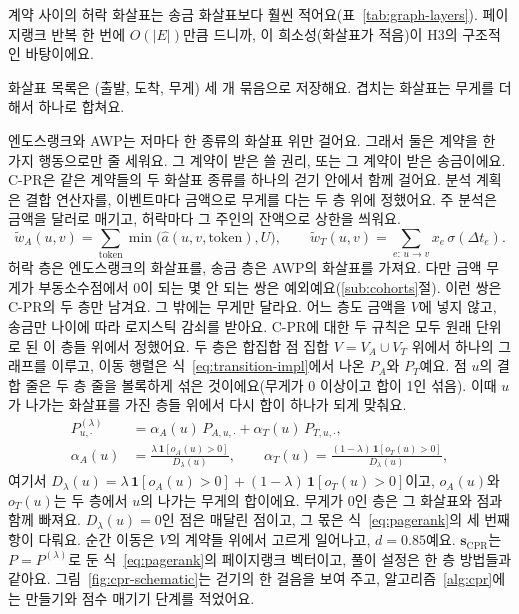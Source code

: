 계약 사이의 허락 화살표는 송금 화살표보다 훨씬 적어요(표~\ref{tab:graph-layers}). 페이지랭크 반복 한 번에 $O(|E|)$만큼 드니까, 이 희소성(화살표가 적음)이 H3의 구조적인 바탕이에요.

화살표 목록은 (출발, 도착, 무게) 세 개 묶음으로 저장해요. 겹치는 화살표는 무게를 더해서 하나로 합쳐요.


엔도스랭크와 AWP는 저마다 한 종류의 화살표 위만 걸어요. 그래서 둘은 계약을 한 가지 행동으로만 줄 세워요. 그 계약이 받은 쓸 권리, 또는 그 계약이 받은 송금이에요. \mbox{C-PR}은 같은 계약들의 두 화살표 종류를 하나의 걷기 안에서 함께 걸어요. 분석 계획은 결합 연산자를, 이벤트마다 금액으로 무게를 다는 두 층 위에 정했어요. 주 분석은 금액을 달러로 매기고, 허락마다 그 주인의 잔액으로 상한을 씌워요.
\begin{equation}
\label{eq:raw-layers}
\tilde w_A(u,v)
=
\sum_{\mathrm{token}}
\min\bigl(\hat a(u,v,\mathrm{token}),U\bigr),
\qquad
\tilde w_T(u,v)
=
\sum_{e:\,u\to v}
x_e\,\sigma(\Delta t_e).
\end{equation}
허락 층은 엔도스랭크의 화살표를, 송금 층은 AWP의 화살표를 가져요. 다만 금액 무게가 부동소수점에서 0이 되는 몇 안 되는 쌍은 예외예요(\ref{sub:cohorts}절). 이런 쌍은 \mbox{C-PR}의 두 층만 남겨요. 그 밖에는 무게만 달라요. 어느 층도 금액을 $V$에 넣지 않고, 송금만 나이에 따라 로지스틱 감쇠를 받아요. \mbox{C-PR}에 대한 두 규칙은 모두 원래 단위로 된 이 층들 위에서 정했어요. 두 층은 합집합 점 집합 $V=V_A\cup V_T$ 위에서 하나의 그래프를 이루고, 이동 행렬은 식~\eqref{eq:transition-impl}에서 나온 $P_A$와 $P_T$예요. 점 $u$의 결합 줄은 두 층 줄을 볼록하게 섞은 것이에요(무게가 0 이상이고 합이 1인 섞음). 이때 $u$가 나가는 화살표를 가진 층들 위에서 다시 합이 하나가 되게 맞춰요.
\begin{align}
P^{(\lambda)}_{u,\cdot}
&=
\alpha_A(u)\,P_{A,u,\cdot}+\alpha_T(u)\,P_{T,u,\cdot},
\label{eq:coupled-transition}\\
\alpha_A(u)
&=
\frac{\lambda\,\mathbf{1}[o_A(u)>0]}{D_{\lambda}(u)},
\qquad
\alpha_T(u)=\frac{(1-\lambda)\,\mathbf{1}[o_T(u)>0]}{D_{\lambda}(u)},
\nonumber
\end{align}
여기서 $D_{\lambda}(u)=\lambda\,\mathbf{1}[o_A(u)>0]+(1-\lambda)\,\mathbf{1}[o_T(u)>0]$이고, $o_A(u)$와 $o_T(u)$는 두 층에서 $u$의 나가는 무게의 합이에요. 무게가 $0$인 층은 그 화살표와 점과 함께 빠져요. $D_{\lambda}(u)=0$인 점은 매달린 점이고, 그 몫은 식~\eqref{eq:pagerank}의 세 번째 항이 다뤄요. 순간 이동은 $V$의 계약들 위에서 고르게 일어나고, $d=0.85$예요. $\mathbf{s}_{\mathrm{CPR}}$는 $P=P^{(\lambda)}$로 둔 식~\eqref{eq:pagerank}의 페이지랭크 벡터이고, 풀이 설정은 한 층 방법들과 같아요. 그림~\ref{fig:cpr-schematic}는 걷기의 한 걸음을 보여 주고, 알고리즘~\ref{alg:cpr}에는 만들기와 점수 매기기 단계를 적었어요.

